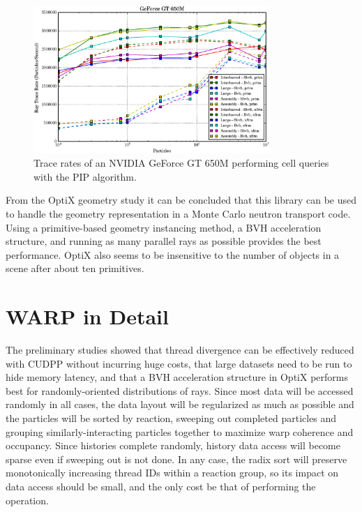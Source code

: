 \begin{figure}[h!] 
  \centering
    \includegraphics[width=0.8\textwidth]{graphics/prelim_optix_G650M.eps}
     \caption{Trace rates of an NVIDIA GeForce GT 650M performing cell queries with the PIP algorithm. \label{prelim_optix_G650M} }
\end{figure}%

From the OptiX geometry study it can be concluded that this library can be used to handle the geometry representation in a Monte Carlo neutron transport code.  Using a primitive-based geometry instancing method, a BVH acceleration structure, and running as many parallel rays as possible provides the best performance.  OptiX also seems to be insensitive to the number of objects in a scene after about ten primitives.


\section{WARP in Detail}

The preliminary studies showed that thread divergence can be effectively reduced with CUDPP without incurring huge costs, that large datasets need to be run to hide memory latency, and that a BVH acceleration structure in OptiX performs best for randomly-oriented distributions of rays.  Since most data will be accessed randomly in all cases, the data layout will be regularized as much as possible and the particles will be sorted by reaction, sweeping out completed particles and grouping similarly-interacting particles together to maximize warp coherence and occupancy. 
 Since histories complete randomly, history data access will become sparse even if sweeping out is not done. %
 In any case, the radix sort%
 will preserve monotonically increasing thread IDs within a reaction group, so its impact on data access should be small, and the only cost be that of performing the operation.

